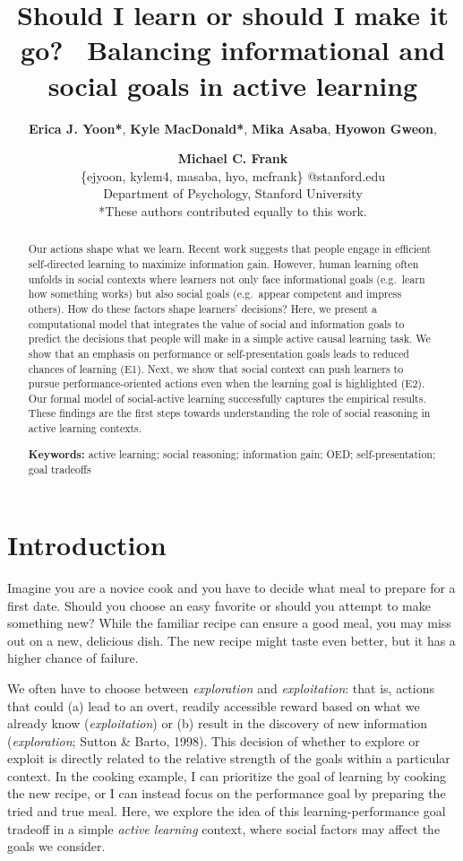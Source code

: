 \documentclass[10pt, letterpaper]{article}
\title{Should I learn or should I make it go? ~Balancing informational and
social goals in active learning}
\author{{\large \bf Erica J. Yoon*}, {\large \bf Kyle MacDonald*}, {\large \bf Mika Asaba}, {\large \bf Hyowon Gweon}, \and {\large \bf Michael C. Frank} \\ \{ejyoon, kylem4, masaba, hyo, mcfrank\} @stanford.edu \\ Department of Psychology, Stanford University \\ *These authors contributed equally to this work.}
\begin{document}
\maketitle

\begin{abstract}
Our actions shape what we learn. Recent work suggests that people engage
in efficient self-directed learning to maximize information gain.
However, human learning often unfolds in social contexts where learners
not only face informational goals (e.g.~learn how something works) but
also social goals (e.g.~appear competent and impress others). How do
these factors shape learners' decisions? Here, we present a
computational model that integrates the value of social and information
goals to predict the decisions that people will make in a simple active
causal learning task. We show that an emphasis on performance or
self-presentation goals leads to reduced chances of learning (E1). Next,
we show that social context can push learners to pursue
performance-oriented actions even when the learning goal is highlighted
(E2). Our formal model of social-active learning successfully captures
the empirical results. These findings are the first steps towards
understanding the role of social reasoning in active learning contexts.

\textbf{Keywords:}
active learning; social reasoning; information gain; OED;
self-presentation; goal tradeoffs
\end{abstract}

\section{Introduction}\label{introduction}

Imagine you are a novice cook and you have to decide what meal to
prepare for a first date. Should you choose an easy favorite or should
you attempt to make something new? While the familiar recipe can ensure
a good meal, you may miss out on a new, delicious dish. The new recipe
might taste even better, but it has a higher chance of failure.

We often have to choose between \emph{exploration} and
\emph{exploitation}: that is, actions that could (a) lead to an overt,
readily accessible reward based on what we already know
(\emph{exploitation}) or (b) result in the discovery of new information
(\emph{exploration}; Sutton \& Barto, 1998). This decision of whether to
explore or exploit is directly related to the relative strength of the
goals within a particular context. In the cooking example, I can
prioritize the goal of learning by cooking the new recipe, or I can
instead focus on the performance goal by preparing the tried and true
meal. Here, we explore the idea of this learning-performance goal
tradeoff in a simple \emph{active learning} context, where social
factors may affect the goals we consider.
\end{document}
